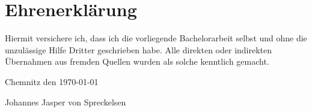 \section*{Ehrenerklärung}
Hiermit versichere ich, dass ich die vorliegende Bachelorarbeit selbst und ohne die unzulässige Hilfe Dritter geschrieben habe. 
Alle direkten oder indirekten Übernahmen aus fremden Quellen wurden als solche kenntlich gemacht.
\vspace{0.5cm}

\noindent Chemnitz den \today

\noindent Johannes Jasper von Spreckelsen
